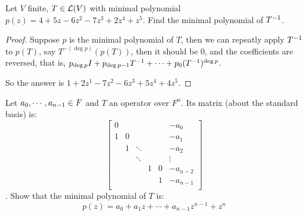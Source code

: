 \documentclass[../main.tex]{subfiles}
\begin{document}
\begin{exercise}
  Let $V$ finite, $T \in \mathcal{L}(V)$ with minimal polynomial $p(z) = 4 + 5z - 6z^2 - 7z^3 + 2z^4 + z^5$.
  Find the minimal polynomial of $T^{-1}$.
\end{exercise}
\begin{proof}
  Suppose $p$ is the minimal polynomial of $T$, then we can
  repeatly apply $T^{-1}$ to $p(T)$, say $T^{-(\deg p)}(p(T))$,
  then it should be $0$, and the coefficients are reversed,
  that is, $p_{\deg p}I + p_{\deg p - 1}T^{-1} + \cdots + p_0(T^{-1})^{\deg p}$.

  So the answer is $1 + 2z^1 - 7z^2 - 6z^3 + 5z^4 + 4z^5$.
\end{proof}

\setcounter{exercise}{15}
\begin{exercise}
  Let $a_0 , \cdots , a_{n - 1} \in F$ and $T$ an operator over $F^n$.
  Its matrix (about the standard basis) is:
  \[
  \begin{bmatrix}
    0 &   &        &   &   & - a_0 \\
    1 & 0 &        &   &   & - a_1 \\
      & 1 & \ddots &   &   & - a_2 \\
      &   & \ddots &   &   & \vdots \\
      &   &        & 1 & 0 & - a_{n - 2} \\
      &   &        &   & 1 & - a_{n - 1} \\
  \end{bmatrix}
  \].
  Show that the minimal polynomial of $T$ is:
  \[
  p(z) = a_0 + a_1 z + \cdots + a_{n - 1}z^{n - 1} + z^n
  \]
\end{exercise}
\end{document}
